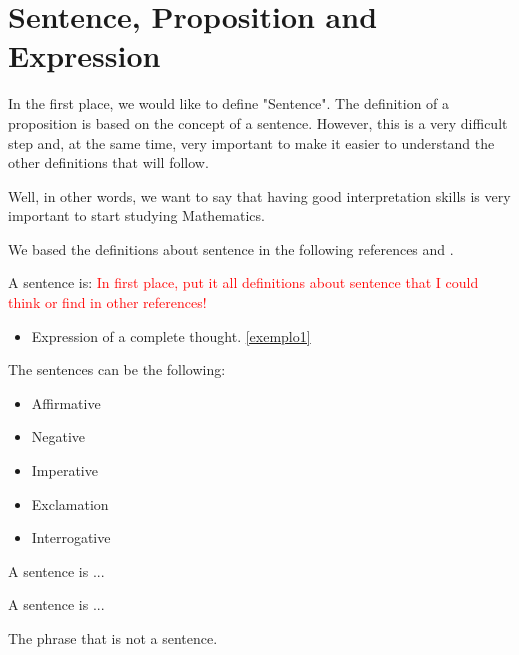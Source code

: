 \section{Sentence, Proposition and Expression}
In the first place, we would like to define "Sentence". The definition of a proposition is based on the concept of a sentence. However, this is a very difficult step and, at the same time, very important to make it easier to understand the other definitions that will follow.

Well, in other words, we want to say that having good interpretation skills is very important to start studying Mathematics.

We based the definitions about sentence in the following references \cite{raymoundmsmullyan} and \cite{whiteheadandrussell}.

\begin{definition}[Sentence]
    A sentence is: \textcolor{red}{In first place, put it all definitions about sentence that I could think or find in other references!}

    \begin{itemize}
        \item Expression of a complete thought. \ref{exemplo1}
    \end{itemize}

\end{definition}

The sentences can be the following:

\begin{itemize}
    \item Affirmative
    \item Negative
    \item Imperative
    \item Exclamation
    \item Interrogative
\end{itemize}

\begin{definition}
A sentence is ...


\end{definition}

\begin{definition}
A sentence is ...


\end{definition}

\begin{remark}[Expression]
    The phrase that is not a sentence.
\end{remark}

